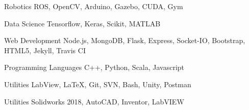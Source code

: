 
\begin{cvskills}

  \cvskill
    {Robotics}
    {ROS, OpenCV, Arduino, Gazebo, CUDA, Gym}

  \cvskill
    {Data Science} %
    {Tensorflow, Keras, Scikit, MATLAB} %

  \cvskill
    {Web Development} %
    {Node.js, MongoDB, Flask, Express, Socket-IO, Bootstrap, HTML5,  Jekyll, Travis CI} %

  \cvskill
    {Programming Languages} %
    {C++, Python, Scala, Javascript} %

  \cvskill
    {Utilities}
    {LabView, \LaTeX, Git, SVN, Bash, Unity, Postman}

  \cvskill
    {Utilities
    {Solidworks 2018, AutoCAD, Inventor, LabVIEW}}

\end{cvskills}
